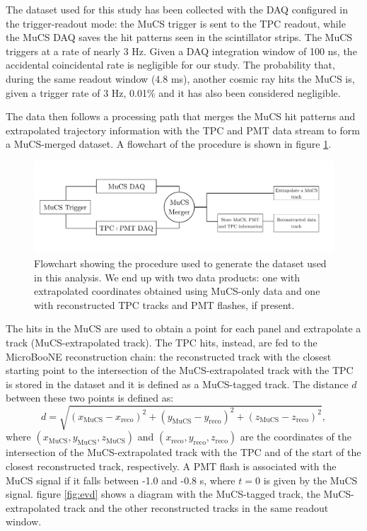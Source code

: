 \documentclass[a4paper]{scrartcl}
\begin{document}
The dataset used for this study has been collected with the DAQ configured in the trigger-readout mode: the MuCS trigger is sent to the TPC readout, while the MuCS DAQ saves the hit patterns seen in the scintillator strips.
The MuCS triggers at a rate of nearly 3 Hz.
Given a DAQ integration window of 100 ns, the accidental coincidental rate is negligible for our study. The probability that, during the same readout window (4.8 ms), another cosmic ray hits the MuCS is, given a trigger rate of 3 Hz, 0.01\% and it has also been considered negligible.

The data then follows a processing path that merges the MuCS hit patterns and extrapolated trajectory information with the TPC and PMT data stream to form a MuCS-merged dataset. A flowchart of the procedure is shown in figure \ref{fig:scheme}.

\begin{figure}[htbp]
  \includegraphics[width=\linewidth]{figures/scheme.pdf}
  \caption{Flowchart showing the procedure used to generate the dataset used in this analysis. We end up with two data products: one with extrapolated coordinates obtained using MuCS-only data and one with reconstructed TPC tracks and PMT flashes, if present.} \label{fig:scheme}
\end{figure}

The hits in the MuCS are used to obtain a point for each panel and extrapolate a track (MuCS-extrapolated track). The TPC hits, instead, are fed to the MicroBooNE reconstruction chain: the reconstructed track with the closest starting point to the intersection of the MuCS-extrapolated track with the TPC is stored in the dataset and it is defined as a MuCS-tagged track. The distance $d$ between these two points is defined as:
\begin{equation}\label{eq:d}
d = \sqrt{(x_{\mathrm{MuCS}}-x_{\mathrm{reco}})^2+(y_{\mathrm{MuCS}}-y_{\mathrm{reco}})^2+(z_{\mathrm{MuCS}}-z_{\mathrm{reco}})^2},
\end{equation}
where $(x_{\mathrm{MuCS}},y_{\mathrm{MuCS}},z_{\mathrm{MuCS}})$ and $(x_{\mathrm{reco}},y_{\mathrm{reco}},z_{\mathrm{reco}})$ are the coordinates of the intersection of the MuCS-extrapolated track with the TPC and of the start of the closest reconstructed track, respectively.
A PMT flash is associated with the MuCS signal if it falls between -1.0 and -0.8 \textmu s, where $t=0$ is given by the MuCS signal.
figure \ref{fig:evd} shows a diagram with the MuCS-tagged track, the MuCS-extrapolated track and the other reconstructed tracks in the same readout window.
\end{document}
